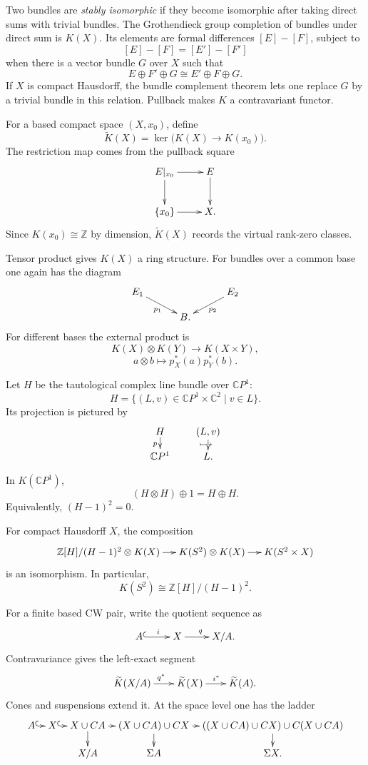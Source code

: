 Two bundles are \emph{stably isomorphic} if
they become isomorphic after taking direct
sums with trivial bundles.  The Grothendieck
group completion of bundles under direct sum
is $K(X)$.  Its elements are formal
differences $[E]-[F]$, subject to
$$
[E]-[F]=[E']-[F']
$$
when there is a vector bundle $G$ over $X$
such that
$$
E\oplus F'\oplus G
\cong
E'\oplus F\oplus G.
$$
If $X$ is compact Hausdorff, the bundle
complement theorem lets one replace $G$ by
a trivial bundle in this relation.  Pullback
makes $K$ a contravariant functor.

For a based compact space $(X,x_0)$, define
$$
\widetilde K(X)=
\ker\bigl(K(X)\longrightarrow K(x_0)\bigr).
$$
The restriction map comes from the pullback
square
$$
\xymatrix{
E|_{x_0}\ar[r]\ar[d]&E\ar[d]\\
\{x_0\}\ar[r]&X.
}
$$
Since $K(x_0)\cong\mathbb{Z}$ by dimension,
$\widetilde K(X)$ records the virtual
rank-zero classes.

Tensor product gives $K(X)$ a ring structure.
For bundles over a common base one again has
the diagram
$$
\xymatrix@C=30pt@R=12pt{
E_1\ar[dr]_{p_1}&&E_2\ar[dl]^{p_2}\\
&B.&
}
$$
For different bases the external product is
$$
K(X)\otimes K(Y)
\longrightarrow K(X\times Y),
$$
$$
a\otimes b\longmapsto
p_X^*(a)p_Y^*(b).
$$

Let $H$ be the tautological complex line
bundle over $\mathbb{C}P^1$:
$$
H=\{(L,v)\in\mathbb{C}P^1\times
\mathbb{C}^2\mid v\in L\}.
$$
Its projection is pictured by
$$
\xymatrix@C=20pt@R=10pt{
H\ar[d]_p&(L,v)\ar[d]|-{
\hspace{-4pt}\longmapsto}\\
\mathbb{C}P^1&L.
}
$$

\begin{proposition}[Claim]
\label{at-claim-hopf-bundle-relation}
In $K(\mathbb{C}P^1)$,
$$
(H\otimes H)\oplus1=H\oplus H.
$$
Equivalently, $(H-1)^2=0$.
\end{proposition}

\begin{theorem}
\label{at-theorem-k-product}
For compact Hausdorff $X$, the composition
$$
\xymatrix@C=13pt{
\mathbb{Z}[H]/(H-1)^2\otimes K(X)
\ar[r]&K(S^2)\otimes K(X)\ar[r]&
K(S^2\times X)
}
$$
is an isomorphism.  In particular,
$$
K(S^2)\cong\mathbb{Z}[H]/(H-1)^2.
$$
\end{theorem}

For a finite based CW pair, write the
quotient sequence as
$$
\xymatrix{
A\ar@{^{(}->}[r]^i&X\ar[r]^q&X/A.
}
$$
Contravariance gives the left-exact segment
$$
\xymatrix@C=20pt{
\widetilde K(X/A)\ar[r]^{q^*}&
\widetilde K(X)\ar[r]^{i^*}&
\widetilde K(A).
}
$$
Cones and suspensions extend it.  At the
space level one has the ladder
$$
\xymatrix@C=7pt@R=12pt{
A\ar@{^{(}->}[r]&X\ar@{^{(}->}[r]&
X\cup CA\ar[r]\ar[d]&
(X\cup CA)\cup CX\ar[r]\ar[d]&
((X\cup CA)\cup CX)\cup C(X\cup CA)
\ar[d]\\
&&X/A&\Sigma A&\Sigma X.
}
$$

